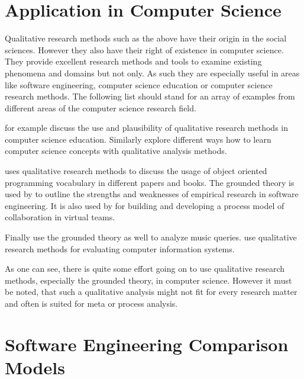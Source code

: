 
\section{Application in Computer Science} %

Qualitative research methods such as the above have their origin in the social
sciences. However they also have their right of existence in computer science.
They provide excellent research methods and tools to examine existing phenomena
and domains but not only. As such they are especially useful in areas like
software engineering, computer science education or computer science research
methods. The following list should stand for an array of examples from
different areas of the computer science research field.

\textcite{Hazzan2006} for example discuss the use and plausibility of
qualitative research methods in computer science education. Similarly
\textcite{Meerbaum-Salant2010} explore different ways how to learn computer
science concepts with qualitative analysis methods.

\textcite{Armstrong2006} uses qualitative research methods to discuss the usage
of object oriented programming vocabulary in different papers and books. The
grounded theory is used by \textcite{Perry2000} to outline the strengths and
weaknesses of empirical research in software engineering. It is also used by
\textcite{Sarker2001} for building and developing a process model of
collaboration in virtual teams.

Finally \textcite{Bainbridge2003} use the grounded theory as well to analyze
music queries. \textcite{Kaplan1994} use qualitative research methods for
evaluating computer information systems.

As one can see, there is quite some effort going on to use qualitative research
methods, especially the grounded theory, in computer science. However it must
be noted, that such a qualitative analysis might not fit for every research
matter and often is suited for meta or process analysis.


\section{Software Engineering Comparison Models} %



